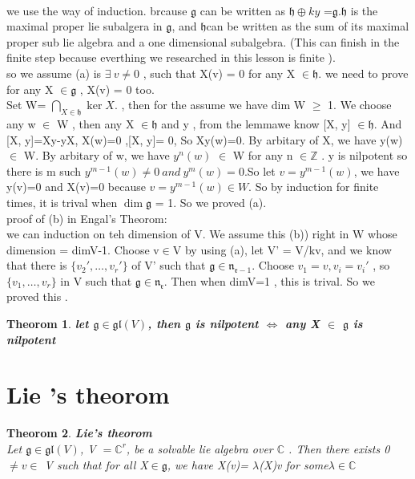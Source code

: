 \documentclass[UTF8]{ctexart}
\newtheorem{theorom}{Theorom}[section]
\begin{document}
\\we use the way of induction. brcause $\mathfrak{g}$ can be written as $\mathfrak{h}\oplus ky$ =$\mathfrak{g}.$$\mathfrak{h}$ is 
the maximal proper lie subalgera in $\mathfrak{g}$, and $\mathfrak{h} $can be written as the sum of its maximal proper sub lie algebra
and a one dimensional subalgebra. (This can finish in the finite step because everthing we researched in this lesson is finite ). 
\\so we assume (a) is $\exists \  v \neq 0$ , such that X(v) = 0 for any X $\in \mathfrak{h}$.  we need to prove for any X 
$\in \mathfrak{g}$ , X(v) = 0 too. 
\\Set W= $\bigcap_{X \in \mathfrak{h}} \ker X.  $  , then for the assume we have dim W $\geq$ 1. 
We choose any w $\in$ W , then any X $\in \mathfrak{h}$ and y , from the lemmawe know [X, y] $\in \mathfrak{h}$. 
And [X, y]=Xy-yX, X(w)=0 ,[X, y]= 0, So Xy(w)=0. By arbitary of X, we have y(w) $\in$ W. By arbitary of w, we have $y^n(w)$ $\in$ W for any n $\in \mathbb{Z}$ .
y is nilpotent so there is m such $y^{m-1}(w) \neq 0 \ and \  y^{m}(w)=0 $.So let $v= y^{m-1} (w)$, we have y(v)=0 and X(v)=0 because  $v= y^{m-1} (w) \in W$. 
So by induction for finite times, it is trival when $\dim \mathfrak{g}$ = 1. 
So we proved (a). 
\\proof of (b) in Engal's Theorom:
\\we can induction on teh dimension of V. We assume this (b)) right in W whose dimension = dimV-1.  
Choose v$ \in $V by using (a), let V' = V/kv, and we know that there is $\{v_2', \dots , v_r'\}$ of V' such that $\mathfrak{g} \in \mathfrak{n_{r-1}}$. 
Choose $v_1=v, v_i=v_i'$ , so $\{v_1, \dots , v_r\}$ in V such that $\mathfrak{g} \in \mathfrak{n_{r}}$. 
Then when dimV=1 , this is trival. So we proved this . 

\begin{theorom}
    \textbf{let $\mathfrak{g} \in \mathfrak{gl}(V)$, then $\mathfrak{g}$ is nilpotent $\Leftrightarrow$  any X $\in$ $\mathfrak{g}$ is nilpotent} 
\end{theorom}
 

\section{Lie 's theorom }
\begin{theorom}
    \textbf{ Lie's theorom}
    \\ Let $\mathfrak{g} \in \mathfrak{gl}(V)$, V $= \mathbb{C}^r $, be a solvable lie algebra over $\mathbb{C}$ . Then there 
    exists 0 $\neq v \in $ V such that for all X$\in \mathfrak{g}$, we have X(v)= $\lambda$(X)v for some$ \lambda  \in \mathbb{C}  $   
\end{theorom}
\end{document}
